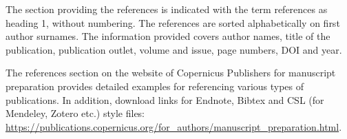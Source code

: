 \documentclass[agile, final]{copernicus-agile}
\begin{document}
The section providing the references is indicated with the term references as heading 1, without numbering. The references are sorted alphabetically on first author surnames. The information provided covers author names, title of the publication, publication outlet, volume and issue, page numbers, DOI and year.

The references section on the website of Copernicus Publishers for manuscript preparation provides detailed examples for referencing various types of publications. In addition, download links for Endnote, Bibtex and CSL (for Mendeley, Zotero etc.) style files: \url{https://publications.copernicus.org/for_authors/manuscript_preparation.html}.


















\end{document}
